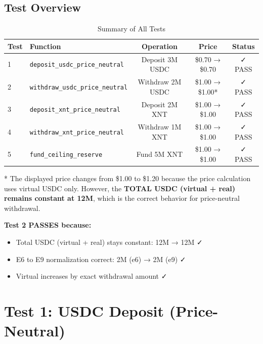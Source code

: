 \documentclass[11pt,a4paper]{article}
\begin{document}
\subsection{Test Overview}

\begin{table}[h]
\centering
\begin{tabularx}{\textwidth}{|l|X|c|c|c|}
\hline
\textbf{Test} & \textbf{Function} & \textbf{Operation} & \textbf{Price} & \textbf{Status} \\
\hline
1 & \texttt{deposit\_usdc\_price\_neutral} & Deposit 3M USDC & \$0.70 → \$0.70 & ✓ PASS \\
\hline
2 & \texttt{withdraw\_usdc\_price\_neutral} & Withdraw 2M USDC & \$1.00 → \$1.00* & ✓ PASS \\
\hline
3 & \texttt{deposit\_xnt\_price\_neutral} & Deposit 2M XNT & \$1.00 → \$1.00 & ✓ PASS \\
\hline
4 & \texttt{withdraw\_xnt\_price\_neutral} & Withdraw 1M XNT & \$1.00 → \$1.00 & ✓ PASS \\
\hline
5 & \texttt{fund\_ceiling\_reserve} & Fund 5M XNT & \$1.00 → \$1.00 & ✓ PASS \\
\hline
\end{tabularx}
\caption{Summary of All Tests}
\label{tab:summary}
\end{table}

\begin{tcolorbox}[colback=warning!10,colframe=warning,title=Note on Test 2]
* The displayed price changes from \$1.00 to \$1.20 because the price calculation uses virtual USDC only. However, the \textbf{TOTAL USDC (virtual + real) remains constant at 12M}, which is the correct behavior for price-neutral withdrawal.

\textbf{Test 2 PASSES because:}
\begin{itemize}
    \item Total USDC (virtual + real) stays constant: 12M → 12M ✓
    \item E6 to E9 normalization correct: 2M (e6) → 2M (e9) ✓
    \item Virtual increases by exact withdrawal amount ✓
\end{itemize}
\end{tcolorbox}

\newpage

\section{Test 1: USDC Deposit (Price-Neutral)}
\end{document}
